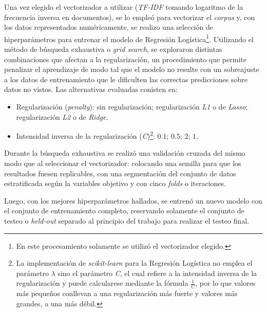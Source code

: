 Una vez elegido el vectorizador a utilizar (\textit{TF-IDF} tomando
logaritmo de la frecuencia inversa en documentos), se lo empleó para
vectorizar el \textit{corpus} y, con los datos representados
numéricamente, se realizo una selección
de hiperparámetros para entrenar el modelo de Regresión Logística\footnote{
En este procesamiento solamente se utilizó el vectorizador elegido.}.
Utilizando el método de búsqueda exhaustiva o \textit{grid search}, se
exploraron distintas combinaciones que afectan a la regularización,
un procedimiento que permite penalizar el aprendizaje de modo tal que
el modelo no resulte con un sobreajuste a los datos de entrenamiento que
le dificulten las correctas predicciones sobre datos no vistos. Las
alternativas evaluadas conisten en:

\begin{itemize}
    \item Regularización (\textit{penalty}): sin regularización; regularización \textit{L1}
    o de \textit{Lasso}; regularización \textit{L2} o de \textit{Ridge}.
    \item Intensidad inversa de la regularización (\textit{C})\footnote{
    La implementación de \textit{scikit-learn} para la Regresión
    Logística no emplea el parámetro $\lambda$ sino el parámetro \textit{C},
    el cual refiere a la intensidad inversa de la regularización y puede
    calcularese mediante la fórmula $\frac{1}{C}$, por lo que valores
    más pequeños conllevan a una regularización más fuerte y valores más
    grandes, a una más débil.}: $0.1$; $0.5$; $2$; $1$,
\end{itemize}

Durante la búsqueda exhaustiva se realizó una validación cruzada del mismo
modo que al seleccionar el vectorizador: colocando una semilla para que los
resultados fuesen replicables, con una segmentación del conjunto de datos
estratificada según la variables objetivo y con cinco \textit{folds} o
iteraciones.
\par
Luego, con los mejores hiperparámetros hallados, se entrenó un nuevo modelo
con el conjunto de entrenamiento completo, reservando solamente el
conjunto de testeo o \textit{held-out} separado al principio del trabajo
para realizar el testeo final.
